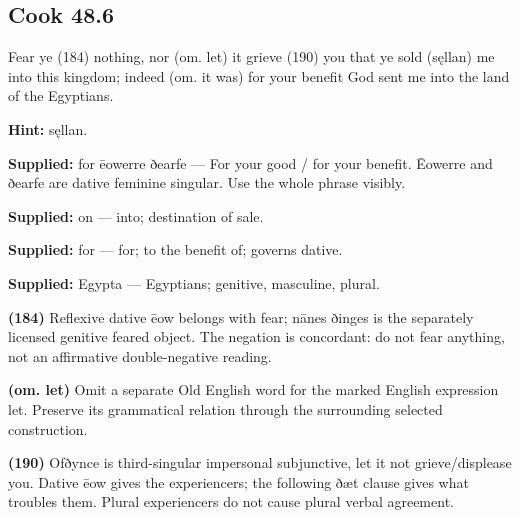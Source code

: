 \par\begin{minipage}{\linewidth}\raggedright
\subsection*{Cook 48.6}

Fear ye (184) nothing, nor (om. let) it grieve (190) you that ye sold (sęllan) me into this kingdom; indeed (om. it was) for your benefit God sent me into the land of the Egyptians.

\textbf{Hint:} sęllan.

\end{minipage}\par\addvspace{4pt}

\textbf{Supplied:} for ēowerre ðearfe — For your good /\allowbreak{} for your benefit. Ēowerre and ðearfe are dative feminine singular. Use the whole phrase visibly.

\textbf{Supplied:} on — into; destination of sale.

\textbf{Supplied:} for — for; to the benefit of; governs dative.

\textbf{Supplied:} Egypta — Egyptians; genitive, masculine, plural.

\textbf{(184)} Reflexive dative ēow belongs with fear; nānes ðinges is the separately licensed genitive feared object. The negation is concordant: do not fear anything, not an affirmative double-negative reading.

\textbf{(om. let)} Omit a separate Old English word for the marked English expression let. Preserve its grammatical relation through the surrounding selected construction.

\textbf{(190)} Ofðynce is third-singular impersonal subjunctive, let it not grieve/\allowbreak{}displease you. Dative ēow gives the experiencers; the following ðæt clause gives what troubles them. Plural experiencers do not cause plural verbal agreement.


